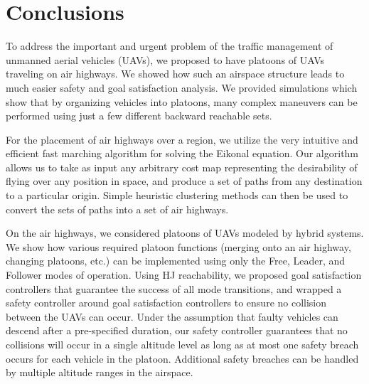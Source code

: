 \section{Conclusions}
To address the important and urgent problem of the traffic management of unmanned aerial vehicles (UAVs), we proposed to have platoons of UAVs traveling on air highways. We showed how such an airspace structure leads to much easier safety and goal satisfaction analysis. We provided simulations which show that by organizing vehicles into platoons, many complex maneuvers can be performed using just a few different backward reachable sets.

For the placement of air highways over a region, we utilize the very intuitive and efficient fast marching algorithm for solving the Eikonal equation. Our algorithm allows us to take as input any arbitrary cost map representing the desirability of flying over any position in space, and produce a set of paths from any destination to a particular origin. Simple heuristic clustering methods can then be used to convert the sets of paths into a set of air highways.

On the air highways, we considered platoons of UAVs modeled by hybrid systems. We show how various required platoon functions (merging onto an air highway, changing platoons, etc.) can be implemented using only the Free, Leader, and Follower modes of operation. Using HJ reachability, we proposed goal satisfaction controllers that guarantee the success of all mode transitions, and wrapped a safety controller around goal satisfaction controllers to ensure no collision between the UAVs can occur. Under the assumption that faulty vehicles can descend after a pre-specified duration, our safety controller guarantees that no collisions will occur in a single altitude level as long as at most one safety breach occurs for each vehicle in the platoon. Additional safety breaches can be handled by multiple altitude ranges in the airspace. 

